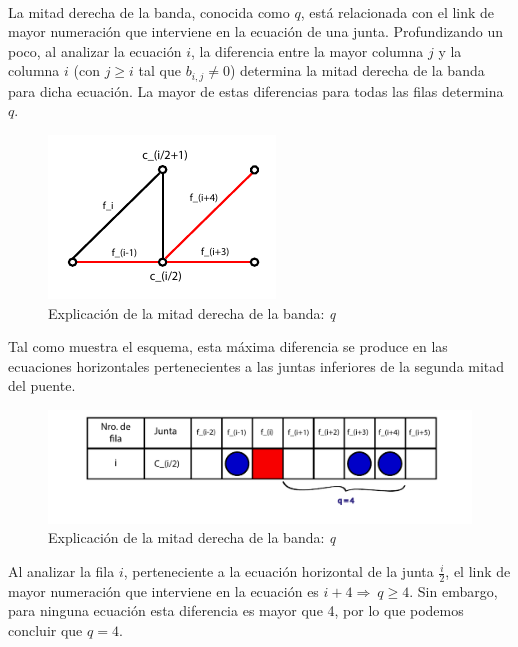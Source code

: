 ~

La mitad derecha de la banda, conocida como $q$, está relacionada con el link de mayor numeración que interviene en la ecuación
de una junta. Profundizando un poco, al analizar la ecuación $i$, la 
diferencia entre la mayor columna $j$ y la columna $i$ (con $j \geq i$ tal que $b_{i,j} \neq 0$)
determina la mitad derecha de la banda para dicha ecuación. La mayor de estas diferencias para todas las filas determina $q$.

\begin{figure}[!h]
	\begin{center}
		  \includegraphics[scale=1.5]{Imagenes/im_6.pdf}
		  \caption{Explicación de la mitad derecha de la banda: \emph{q}}
		  \label{fig:contra1}
	\end{center}
\end{figure}
\FloatBarrier

Tal como muestra el esquema, esta máxima diferencia se produce en las ecuaciones horizontales pertenecientes a las juntas
inferiores de la segunda mitad del puente. 

\begin{figure}[!h]
	\begin{center}
		  \includegraphics[scale=0.5]{Imagenes/im_7.pdf}
		  \caption{Explicación de la mitad derecha de la banda: \emph{q}}
		  \label{fig:contra1}
	\end{center}
\end{figure}
\FloatBarrier

Al analizar la fila $i$, perteneciente a la ecuación horizontal de la junta $\frac{i}{2}$, el link de mayor numeración que
interviene en la ecuación es $i+4 \Rightarrow \ q \geq 4$. Sin embargo, para ninguna ecuación esta diferencia es mayor que 
4, por lo que podemos concluir que $q=4$.
